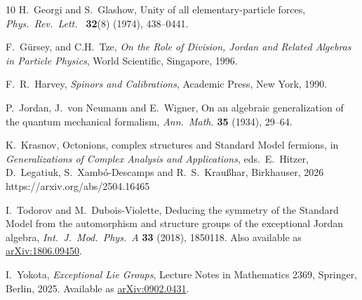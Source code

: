 \documentclass{article}
\theoremstyle{plain}
\theoremstyle{remark}
\theoremstyle{definition}
\begin{document}
\begin{thebibliography}{10}
 H.\ Georgi and S.\ Glashow, Unity of all elementary-particle forces, \textsl{Phys.\ Rev.\ Lett.\ } \textbf{32}(8) (1974), 438–0441.

 F.\ G\"ursey, and C.\-H.\ Tze, \textsl{On the Role of Division, Jordan and Related Algebras in Particle Physics}, World Scientific, Singapore, 1996.

 F.~R.~Harvey, \emph{Spinors and Calibrations}, Academic Press, New York, 1990.

 P.~Jordan, J.\ von Neumann and E.\ Wigner, On an algebraic generalization of the quantum mechanical formalism, \textsl{Ann.\ Math. }\textbf{35} (1934), 29--64. 

 K.\ Krasnov, Octonions, complex structures and Standard Model fermions, in \textsl{Generalizations of Complex Analysis and Applications}, eds.\ E.\ Hitzer, D.\ Legatiuk, S.\ Xamb\'o-Descamps and R.\ S.\ Krau\ss{har}, Birkhauser, 2026 https://arxiv.org/abs/2504.16465

 I.\ Todorov and M.\ Dubois-Violette, Deducing the symmetry of the Standard Model from the automorphism and structure groups of the exceptional Jordan algebra, \textsl{Int.\ J.\ Mod.\ Phys.\ A} \textbf{33} (2018), 1850118.  Also available as \href{http://arxiv.org/abs/1806.09450}{arXiv:1806.09450}.

 I.~Yokota, \textsl{Exceptional Lie Groups}, Lecture Notes in Mathematics 2369, Springer, Berlin, 2025.  Available as \href{https://arxiv.org/abs/0902.0431}{arXiv:0902.0431}.

\end{thebibliography}
\end{document}
